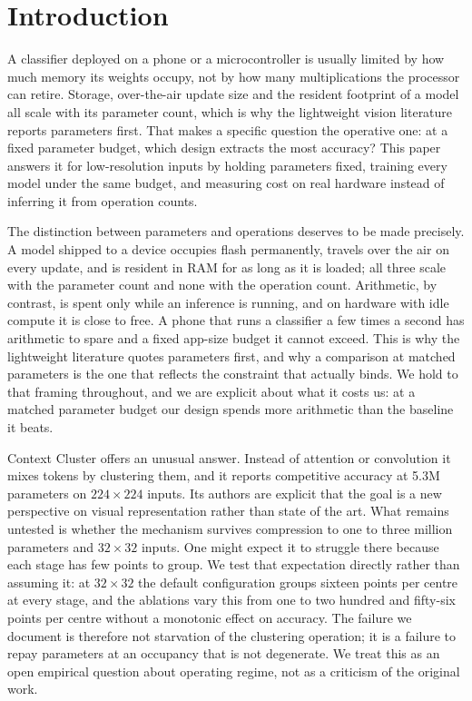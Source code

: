
\section{Introduction}
\label{sec:intro}

A classifier deployed on a phone or a microcontroller is usually limited by
how much memory its weights occupy, not by how many multiplications the
processor can retire. Storage, over-the-air update size and the resident
footprint of a model all scale with its parameter count, which is why the
lightweight vision literature reports parameters first. That makes a specific
question the operative one: at a fixed parameter budget, which design extracts
the most accuracy? This paper answers it for low-resolution inputs by holding
parameters fixed, training every model under the same budget, and measuring
cost on real hardware instead of inferring it from operation counts.

The distinction between parameters and operations deserves to be made
precisely. A model
shipped to a device occupies flash permanently, travels over the air on every
update, and is resident in RAM for as long as it is loaded; all three scale
with the parameter count and none with the operation count. Arithmetic, by
contrast, is spent only while an inference is running, and on hardware with
idle compute it is close to free. A phone that runs a classifier a few times a
second has arithmetic to spare and a fixed app-size budget it cannot exceed.
This is why the lightweight literature quotes parameters first, and why a
comparison at matched parameters is the one that reflects the constraint that
actually binds. We hold to that framing throughout, and we are explicit about
what it costs us: at a matched parameter budget our design spends more
arithmetic than the baseline it beats.

Context Cluster \cite{coc} offers an unusual answer. Instead of attention or
convolution it mixes tokens by clustering them, and it reports competitive
accuracy at 5.3M parameters on $224\times224$ inputs. Its authors are explicit
that the goal is a new perspective on visual representation rather than state
of the art. What remains untested is whether the mechanism survives
compression to one to three million parameters and $32\times32$ inputs. One
might expect it to struggle there because each stage has few points to group.
We test that expectation directly rather than assuming it: at $32\times32$ the
default configuration groups sixteen points per centre at every stage, and the
ablations vary this from one to two hundred and fifty-six points per centre
without a monotonic effect on accuracy. The failure we document is therefore
not starvation of the clustering operation; it is a failure to repay
parameters at an occupancy that is not degenerate. We treat this as an open
empirical question about operating regime, not as a criticism of the original
work.


